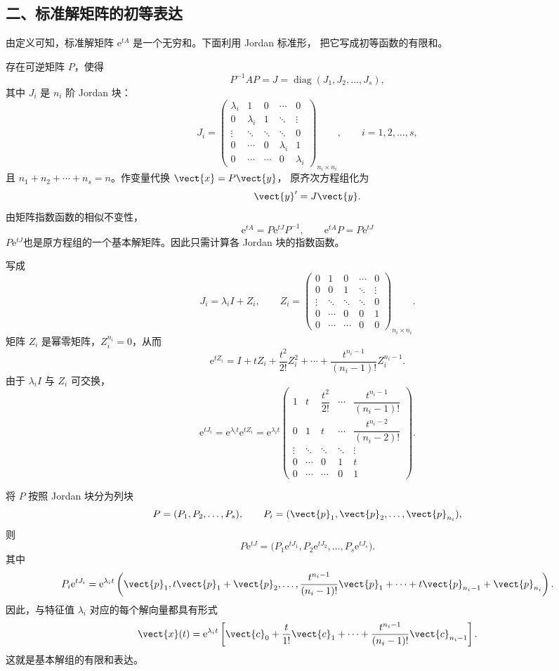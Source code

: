 \subsection*{二、标准解矩阵的初等表达}

由定义可知，标准解矩阵 $\mathrm{e}^{tA}$ 是一个无穷和。下面利用 Jordan 标准形，
把它写成初等函数的有限和。

存在可逆矩阵 $P$，使得
\[
	P^{-1}AP
	=J
	=\operatorname{diag}(J_1,J_2,\ldots,J_s),
\]
其中 $J_i$ 是 $n_i$ 阶 Jordan 块：
\[
	J_i=
	\begin{pmatrix}
		\lambda_i&1&0&\cdots&0\\
		0&\lambda_i&1&\ddots&\vdots\\
		\vdots&\ddots&\ddots&\ddots&0\\
		0&\cdots&0&\lambda_i&1\\
		0&\cdots&\cdots&0&\lambda_i
	\end{pmatrix}_{n_i\times n_i},
	\qquad i=1,2,\ldots,s,
\]
且 $n_1+n_2+\cdots+n_s=n$。作变量代换 $\vect{x}=P\vect{y}$，
原齐次方程组化为
\[
	\vect{y}'=J\vect{y}.
\]
由矩阵指数函数的相似不变性，
\[
	\mathrm{e}^{tA}=P\mathrm{e}^{tJ}P^{-1},
	\qquad
	\mathrm{e}^{tA}P=P\mathrm{e}^{tJ}
\]
$P\mathrm{e}^{tJ}$也是原方程组的一个基本解矩阵。因此只需计算各 Jordan 块的指数函数。

写成
\[
	J_i=\lambda_iI+Z_i,
	\qquad
	Z_i=
	\begin{pmatrix}
		0&1&0&\cdots&0\\
		0&0&1&\ddots&\vdots\\
		\vdots&\ddots&\ddots&\ddots&0\\
		0&\cdots&0&0&1\\
		0&\cdots&\cdots&0&0
	\end{pmatrix}_{n_i\times n_i}.
\]
矩阵 $Z_i$ 是幂零矩阵，$Z_i^{n_i}=0$，从而
\[
	\mathrm{e}^{tZ_i}
	=I+tZ_i+\dfrac{t^2}{2!}Z_i^2+\cdots
	+\dfrac{t^{n_i-1}}{(n_i-1)!}Z_i^{n_i-1}.
\]
由于 $\lambda_iI$ 与 $Z_i$ 可交换，
\[
	\mathrm{e}^{tJ_i}
	=\mathrm{e}^{\lambda_it}\mathrm{e}^{tZ_i}
	=\mathrm{e}^{\lambda_it}
	\begin{pmatrix}
		1&t&\dfrac{t^2}{2!}&\cdots&\dfrac{t^{n_i-1}}{(n_i-1)!}\\
		0&1&t&\cdots&\dfrac{t^{n_i-2}}{(n_i-2)!}\\
		\vdots&\ddots&\ddots&\ddots&\vdots\\
		0&\cdots&0&1&t\\
		0&\cdots&\cdots&0&1
	\end{pmatrix}.
\]

将 $P$ 按照 Jordan 块分为列块
\[
	P=(P_1,P_2,\ldots,P_s),
	\qquad
	P_i=(\vect{p}_1,\vect{p}_2,\ldots,\vect{p}_{n_i}),
\]
则
\[
	P\mathrm{e}^{tJ}
	=\bigl(P_1\mathrm{e}^{tJ_1},
	P_2\mathrm{e}^{tJ_2},\ldots,
	P_s\mathrm{e}^{tJ_s}\bigr).
\]
其中
\[
	P_i\mathrm{e}^{tJ_i}
	=\mathrm{e}^{\lambda_it}
	\left(
	\vect{p}_1,
	t\vect{p}_1+\vect{p}_2,
	\ldots,
	\dfrac{t^{n_i-1}}{(n_i-1)!}\vect{p}_1
	+\cdots+t\vect{p}_{n_i-1}+\vect{p}_{n_i}
	\right).
\]
因此，与特征值 $\lambda_i$ 对应的每个解向量都具有形式
\[
	\vect{x}(t)
	=\mathrm{e}^{\lambda_it}
	\left[
		\vect{c}_0+\dfrac{t}{1!}\vect{c}_1+\cdots
		+\dfrac{t^{n_i-1}}{(n_i-1)!}\vect{c}_{n_i-1}
	\right].
\]
这就是基本解组的有限和表达。

